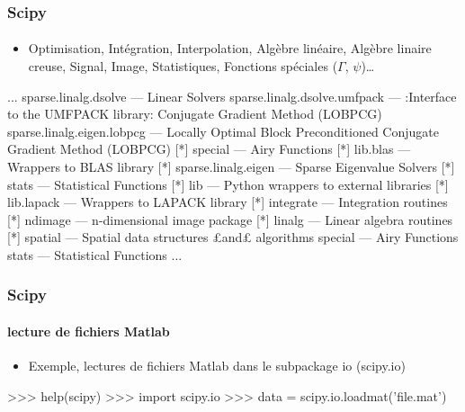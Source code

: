 \begin{frame}[fragile]
\frametitle{Scipy}
\framesubtitle{}
\begin{itemize}
 \item Optimisation, Intégration, Interpolation, Algèbre linéaire, Algèbre linaire creuse, Signal, Image, Statistiques, Fonctions spéciales ($\Gamma$, $\psi$)\dots
\end{itemize}
\begin{pythonConsole}
    ...
     sparse.linalg.dsolve         --- Linear Solvers
     sparse.linalg.dsolve.umfpack --- :Interface to the UMFPACK library:
                                      Conjugate Gradient Method (LOBPCG)
     sparse.linalg.eigen.lobpcg   --- Locally Optimal Block Preconditioned
                                      Conjugate Gradient Method (LOBPCG) [*]
     special                      --- Airy Functions [*]
     lib.blas                     --- Wrappers to BLAS library [*]
     sparse.linalg.eigen          --- Sparse Eigenvalue Solvers [*]
     stats                        --- Statistical Functions [*]
     lib                          --- Python wrappers to external libraries
                                      [*]
     lib.lapack                   --- Wrappers to LAPACK library [*]
     integrate                    --- Integration routines [*]
     ndimage                      --- n-dimensional image package [*]
     linalg                       --- Linear algebra routines [*]
     spatial                      --- Spatial data structures £and£ algorithms
     special                      --- Airy Functions
     stats                        --- Statistical Functions
    ...
\end{pythonConsole}
\end{frame}
\begin{frame}[fragile]
\frametitle{Scipy}
\framesubtitle{lecture de fichiers Matlab}
\begin{itemize}
 \item Exemple, lectures de fichiers Matlab dans le subpackage io (scipy.io)
\end{itemize}

\begin{pythonConsole}
>>> help(scipy)
>>> import scipy.io
>>> data = scipy.io.loadmat('file.mat')
\end{pythonConsole}
\end{frame}

